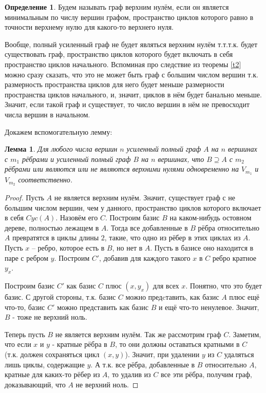 \documentclass[a4paper]{article}
\newtheorem{lemma}[theorem]{Лемма}
\theoremstyle{definition}
\newtheorem{definition}{Определение}[section]
\begin{document}
\begin{definition} \label{d2}
	Будем называть граф верхним нулём, если он является минимальным по числу вершин графом, пространство циклов которого равно в точности верхнему нулю для какого-то верхнего нуля.
\end{definition}


Вообще, полный усиленный граф не будет являться верхним нулём т.т.т.к. будет существовать граф, пространство циклов которого будет включать в себя пространство циклов начального. Вспоминая про следствие из теоремы \ref{t2} можно сразу сказать, что это не может быть граф с большим числом вершин т.к. размерность пространства циклов для него будет меньше размерности пространства циклов начального, и, значит, циклов в нём будет банально меньше.
Значит, если такой граф и существует, то число вершин в нём не превосходит числа вершин в начальном.

Докажем вспомогательную лемму:
\begin{lemma}
	Для любого числа вершин $n$ усиленный полный граф $A$ на $n$ вершинах с $m_1$ рёбрами и усиленный полный граф $B$ на $n$ вершинах, что $B \supseteq A$ с $m_2$ рёбрами или являются или не являются верхними нулями одновременно на $V_{m_1}$ и $V_{m_2}$ соответственно.
\end{lemma}
\begin{proof}
	Пусть $A$ не является верхним нулём. Значит, существует граф с не большим числом вершин, чем у данного, пространство циклов которого включает в себя $Cyc(A)$. Назовём его $C$.
	Построим базис $B$ на каком-нибудь остовном дереве, полностью лежащем в $A$. Тогда все добавленные в $B$ рёбра относительно $A$ превратятся в циклы длины $2$, такие, что одно из рёбер в этих циклах из $A$.  Пусть $x$ -- ребро, которое есть в $B$, но нет в $A$. Пусть в базисе оно находится в паре с ребром $y$. Построим $C'$, добавив для каждого такого $x$ в $C$ ребро кратное $y_x$.
	
	Построим базис $C'$ как базис $C$ плюс $(x, y_x)$ для всех $x$. Понятно, что это будет базис. С другой стороны, т.к. базис $C$ можно предcтавить, как базис $A$ плюс ещё что-то, базис $C'$ можно представить как базис $B$ и ещё что-то ненулевое. Значит, $B$ - тоже не верхний ноль.
	
	Теперь пусть $B$ не является верхним нулём. Так же рассмотрим граф $C$. Заметим, что если $x$ и $y$ - кратные рёбра в $B$, то они должны оставаться кратными в $C$ (т.к. должен сохраняться цикл $(x, y)$). Значит, при удалении $y$ из $C$ удаляться лишь циклы, содержащие $y$. А т.к. все рёбра, добавленные в $B$ относительно $A$, кратные для каких-то рёбер из $A$, то удалив из $C$ все эти рёбра, получим граф, доказывающий, что $A$ не верхний ноль.
\end{proof}
\end{document}
